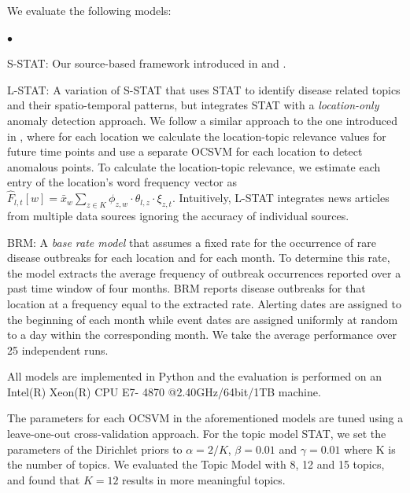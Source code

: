 \documentclass[conference]{IEEEtran}
\newcommand{\squishlist}{
   \begin{list}{$\bullet$}
    {
      \setlength{\itemsep}{0pt}
      \setlength{\parsep}{3pt}
      \setlength{\topsep}{3pt}
      \setlength{\partopsep}{0pt}
      \setlength{\leftmargin}{1.5em}
      \setlength{\labelwidth}{1em}
      \setlength{\labelsep}{0.5em} } }
\newcommand{\squishend}{
    \end{list}  }
\newcommand{\model}{{STAT}\xspace} %
\newcommand{\fullmodel}{{S-STAT}\xspace}
\newcommand{\locationmodel}{{L-STAT}\xspace}
\begin{document}
 We evaluate the following models:
\squishlist
\item \fullmodel: Our source-based framework introduced in  and . 
\item \locationmodel: A variation of \fullmodel that uses \model to identify disease related topics and their spatio-temporal patterns, but integrates \model with a {\em location-only} anomaly detection approach. We follow a similar approach to the one introduced in , where for each location we calculate the location-topic relevance values for future time points and use a separate OCSVM for each location to detect anomalous points. To calculate the location-topic relevance, we estimate each entry of the location's word frequency vector as $\hat{F}_{l,t}[w] = \bar{x}_{w} \sum_{z \in K}\phi_{z,w}\cdot \theta_{l,z} \cdot \xi_{z,t}$. Intuitively,  \locationmodel integrates news articles from multiple data sources ignoring the accuracy of individual sources.
\item BRM: A {\em base rate model} that assumes a fixed rate for the occurrence of rare disease outbreaks for each location and for each
month. To determine this rate, the model extracts the average frequency of outbreak occurrences reported over a past time window of four months. BRM reports disease outbreaks for that location at a frequency equal to the extracted rate. Alerting dates are assigned to the beginning of each month while event dates are assigned uniformly at random to a day within the corresponding month. We take the average performance over 25 independent runs.
\squishend
All models are implemented in Python and the evaluation is performed on an Intel(R) Xeon(R) CPU E7- 4870 @2.40GHz/64bit/1TB machine. 


 The parameters for each OCSVM in the aforementioned models are tuned using a leave-one-out cross-validation approach. For the topic model \model, we set the parameters of the Dirichlet priors to $\alpha = 2/K$, $\beta = 0.01$ and $\gamma = 0.01$ where K is the number of topics. We evaluated the Topic Model with 8, 12 and 15 topics, and found that $K=12$ results in more meaningful topics.  
\end{document}
